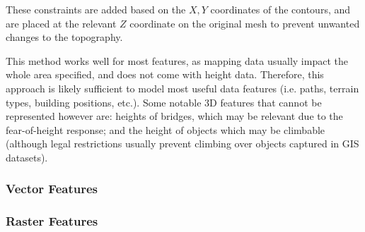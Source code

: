 \documentclass[12pt]{article}
\begin{document}
These constraints are added based on the $X,Y$ coordinates of the contours, and are placed at the relevant $Z$ coordinate on the original mesh to prevent unwanted changes to the topography.

This method works well for most features, as mapping data usually impact the whole area specified, and does not come with height data. Therefore, this approach is likely sufficient to model most useful data features (i.e. paths, terrain types, building positions, etc.). Some notable 3D features that cannot be represented however are: heights of bridges, which may be relevant due to the fear-of-height response; and the height of objects which may be climbable (although legal restrictions usually prevent climbing over objects captured in GIS datasets).

\subsubsection{Vector Features}


\subsubsection{Raster Features}

\end{document}
